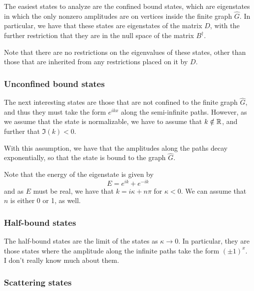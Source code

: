 \documentclass[../thesis-main/thesis-main]{subfiles}
\begin{document}
The easiest states to analyze are the confined bound states, which are eigenstates in which the only nonzero amplitudes are on vertices inside the finite graph $\widehat{G}$.  In particular, we have that these states are eigenstates of the matrix $D$, with the further restriction that they are in the null space of the matrix $B^\dag$.

Note that there are no restrictions on the eigenvalues of these states, other than those that are inherited from any restrictions placed on it by $D$.

\subsubsection{Unconfined bound states}

The next interesting states are those that are not confined to the finite graph $\widehat{G}$, and thus they must take the form $e^{i k x}$ along the semi-infinite paths.  However, as we assume that the state is normalizable, we have to assume that $k\notin \mathbb{R}$, and further that $\Im(k) < 0$.   

With this assumption, we have that the amplitudes along the paths decay exponentially, so that the state is bound to the graph $\widehat{G}$.  

Note that the energy of the eigenstate is given by 
\begin{equation}
  E = e^{i k } + e^{-i k}
\end{equation}
and as $E$ must be real, we have that $k = i \kappa + n\pi$ for $\kappa <0$.  We can assume that $n$ is either 0 or 1, as well.



\subsubsection{Half-bound states}

The half-bound states are the limit of the states as $\kappa \rightarrow 0$.  In particular, they are those states where the amplitude along the infinite paths take the form $(\pm 1)^x$.  I don't really know much about them.



\subsubsection{Scattering states}
\end{document}
